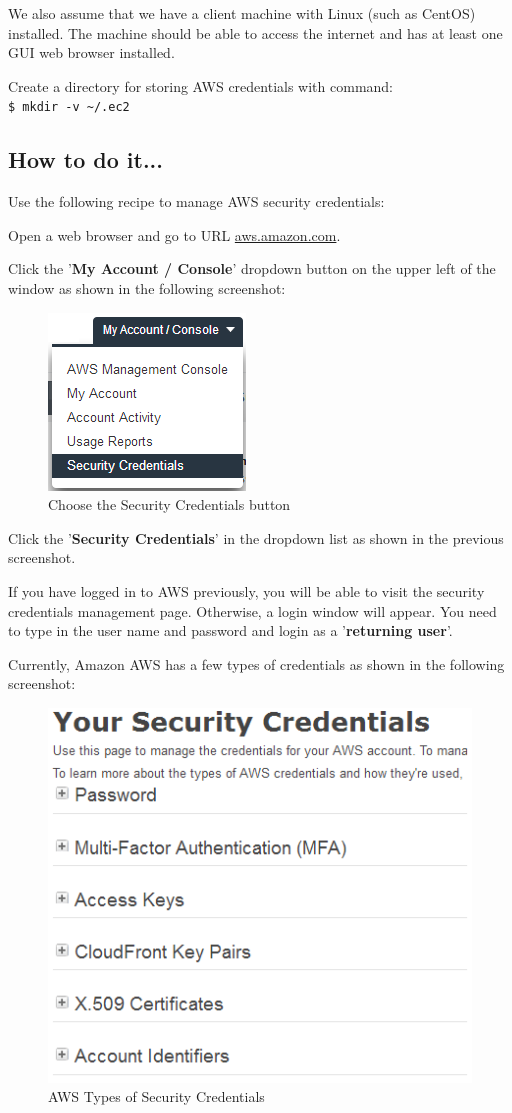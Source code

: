 We also assume that we have a client machine with Linux (such as CentOS) installed. The machine should be able to access the internet and has at least one GUI web browser installed.

Create a directory for storing AWS credentials with command: \\
\verb|$ mkdir -v ~/.ec2|
\subsection*{How to do it...}
Use the following recipe to manage AWS security credentials:

Open a web browser and go to URL \url{aws.amazon.com}.

Click the '\textbf{My Account / Console}' dropdown button on the upper left of the window as shown in the following screenshot:
\begin{figure}[h]
  \centering
  \includegraphics[width=.45\textwidth]{figs/5163os_08_07.png}
  \caption{Choose the Security Credentials button}\label{fig:secu.select}
\end{figure} 

Click the '\textbf{Security Credentials}' in the dropdown list as shown in the previous screenshot.

If you have logged in to AWS previously, you will be able to visit the security credentials management page. Otherwise, a login window will appear. You need to type in the user name and password and login as a '\textbf{returning user}'.

Currently, Amazon AWS has a few types of credentials as shown in the following screenshot:
\begin{figure}[h]
  \centering
  \includegraphics[width=.50\textwidth]{figs/5163os_08_08.png}
  \caption{AWS Types of Security Credentials}\label{fig:aws.credentials.types}
\end{figure} 

